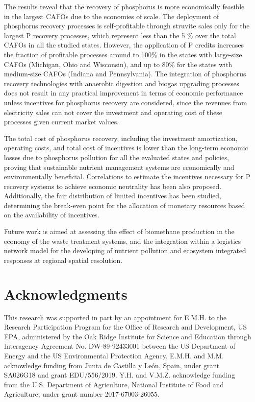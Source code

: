\begin{refsection}[referencesCh5]
The results reveal that the recovery of phosphorus is more economically feasible in the largest CAFOs due to the economies of scale. The deployment of phosphorus recovery processes is self-profitable through struvite sales only for the largest P recovery processes, which represent less than the 5 \% over the total CAFOs in all the studied states. However, the application of P credits increases the fraction of profitable processes around to 100\% in the states with large-size CAFOs (Michigan, Ohio and Wisconsin), and up to 80\% for the states with medium-size CAFOs (Indiana and Pennsylvania). The integration of phosphorus recovery technologies with anaerobic digestion and biogas upgrading processes does not result in any practical improvement in terms of economic performance unless incentives for phosphorus recovery are considered, since the revenues from electricity sales can not cover the investment and operating cost of these processes given current market values.

The total cost of phosphorus recovery, including the investment amortization, operating costs, and total cost of incentives is lower than the long-term economic losses due to phosphorus pollution for all the evaluated states and policies, proving that sustainable nutrient management systems are economically and environmentally beneficial. Correlations to estimate the incentives necessary for P recovery systems to achieve economic neutrality has been also proposed. Additionally, the fair distribution of limited incentives has been studied, determining the break-even point for the allocation of monetary resources based on the availability of incentives.

Future work is aimed at assessing the effect of biomethane production in the economy of the waste treatment systems, and the integration within a logistics network model for the developing of nutrient pollution and ecosystem integrated responses at regional spatial resolution.

\section*{Acknowledgments} \label{section:Acknowledgments}
This research was supported in part by an appointment for E.M.H. to the Research Participation Program for the Office of Research and Development, US EPA, administered by the Oak Ridge Institute for Science and Education through Interagency Agreement No. DW-89-92433001 between the US Department of Energy and the US Environmental Protection Agency. E.M.H. and M.M. acknowledge funding from Junta de Castilla y Le\'{o}n, Spain, under grant SA026G18 and grant EDU/556/2019. Y.H. and V.M.Z. acknowledge funding from the U.S. Department of Agriculture, National Institute of Food and Agriculture, under grant number 2017-67003-26055.


\end{refsection}
